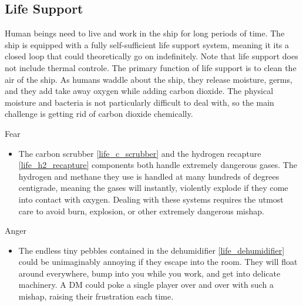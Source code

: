 \documentclass[a4paper]{article}
\begin{document}
\subsection{Life Support} \label{life}

Human beings need to live and work in the ship for long periods of time. The ship is equipped with a fully self-sufficient life support system, meaning it its a closed loop that could theoretically go on indefinitely. Note that life support does not include thermal controle. The primary function of life support is to clean the air of the ship. As humans waddle about the ship, they release moisture, germs, and they add take away oxygen while adding carbon dioxide. The physical moisture and bacteria is not particularly difficult to deal with, so the main challenge is getting rid of carbon dioxide chemically.

\vspace{0.3cm}
\begin{minipage}[t]{0.4\linewidth}
Fear
\begin{itemize}
\item The carbon scrubber \ref{life_c_scrubber} and the hydrogen recapture \ref{life_h2_recapture} components both handle extremely dangerous gases. The hydrogen and methane they use is handled at many hundreds of degrees centigrade, meaning the gases will instantly, violently explode if they come into contact with oxygen. Dealing with these systems requires the utmost care to avoid burn, explosion, or other extremely dangerous mishap.
\end{itemize}
\end{minipage} 
\begin{minipage}[t]{0.4\linewidth}
Anger
\begin{itemize}
\item The endless tiny pebbles contained in the dehumidifier \ref{life_dehumidifier} could be unimaginably annoying if they escape into the room. They will float around everywhere, bump into you while you work, and get into delicate machinery. A DM could poke a single player over and over with such a mishap, raising their frustration each time.
\end{itemize}
\end{minipage}
\end{document}
